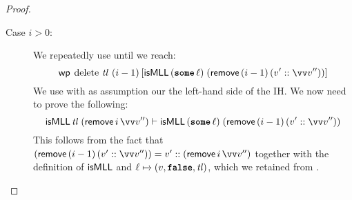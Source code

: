 \documentclass[thesis.tex]{subfiles}
\begin{document}
\begin{proof}
\begin{description}
\begin{description}
        \item[Case $i > 0$:] We repeatedly use  until we reach:
          \[
            \wpre{\MLLdelete\,\langv{tl}\ (\iindex - 1)}{\isMLL\, (\Some \loc)\; (\textlog{remove}\, (\iindex - 1)\, (\val' :: \vect{\val}''))}
          \]
          We use  with as assumption our the left-hand side of the IH. We now need to prove the following:
          \[\isMLL\, \langv{tl}\; (\textlog{remove}\, \iindex\, \vect{\val}'') \proves \isMLL\, (\Some \loc)\; (\textlog{remove}\, (\iindex - 1)\, (\val' :: \vect{\val}''))\]
          This follows from the fact that $(\textlog{remove}\, (\iindex - 1)\, (\val' :: \vect{\val}'')) = \val' :: (\textlog{remove}\, \iindex\, \vect{\val}'')$ together with the definition of $\textsf{\upshape isMLL}$ and $\loc \fmapsto (\val, \False, \langv{tl})$, which we retained from . \qedhere
      \end{description}
  \end{description}
\end{proof}
\end{document}
